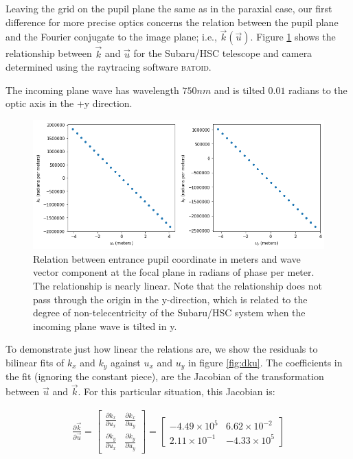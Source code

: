\documentclass{article}
\begin{document}
Leaving the grid on the pupil plane the same as in the paraxial case, our first difference for more
precise optics concerns the relation between the pupil plane and the Fourier conjugate to the image
plane; i.e., $\vec{k}(\vec{u})$.  Figure \ref{fig:ku} shows the relationship between $\vec{k}$ and
$\vec{u}$ for the Subaru/HSC telescope and camera determined using the raytracing software \textsc{batoid}.

The incoming plane wave has wavelength $750 nm$ and is tilted $0.01$ radians to the optic axis in
the +y direction.

\begin{figure}
    \includegraphics[scale=0.7]{ku.png}

    \caption{Relation between entrance pupil coordinate in meters and wave vector component at the
    focal plane in radians of phase per meter. The relationship is nearly linear.  Note that the
    relationship does not pass through the origin in the y-direction, which is related to the degree
    of non-telecentricity of the Subaru/HSC system when the incoming plane wave is tilted in y.}

    \label{fig:ku}
\end{figure}

To demonstrate just how linear the relations are, we show the residuals to bilinear fits of $k_x$
and $k_y$ against $u_x$ and $u_y$ in figure \ref{fig:dku}.  The coefficients in the fit (ignoring
the constant piece), are the Jacobian of the transformation between $\vec{u}$ and $\vec{k}$.  For
this particular situation, this Jacobian is:


\begin{gather}
 \frac{\partial \vec{k}}{\partial \vec{u}}
 =
  \begin{bmatrix} \frac{\partial k_x}{\partial u_x} & \frac{\partial k_x}{\partial u_y} \\
                  \frac{\partial k_y}{\partial u_x} & \frac{\partial k_y}{\partial u_y} \end{bmatrix}
 =
  \begin{bmatrix}
   -4.49 \times 10^5 & 6.62 \times 10^{-2} \\
   2.11 \times 10^{-1} & -4.33 \times 10^5
   \end{bmatrix}
\end{gather}
\end{document}
